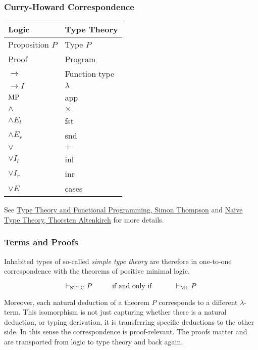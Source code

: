 \documentclass{beamer}
\theoremstyle{indentDefn} \newtheorem{defn}[]{Definition}
\begin{document}
\begin{frame}
  \frametitle{Curry-Howard Correspondence}

  \begin{center}
    \begin{tabular}{l|l}
      Logic & Type Theory \\
      \hline
      Proposition $P$ & Type $P$ \\
      Proof & Program \\
      $\to$ & Function type \\
      $\to I$ & $\lambda$ \\
      $\text{MP}$ & app \\
      $\land$ & $\times$ \\
      $\land E_{l}$ & fst \\
      $\land E_{r}$ & snd \\
      $\lor$ & $+$\\ 
      $\lor I_{l}$ & inl \\
      $\lor I_{r}$ & inr \\
      $\lor E$ & cases  
    \end{tabular}
  \end{center}
  
  See \href{https://www.cs.kent.ac.uk/people/staff/sjt/TTFP/}{Type Theory and Functional Programming, Simon Thompson} and \href{https://people.cs.nott.ac.uk/psztxa/publ/fomus19.pdf}{Naive Type Theory, Thorsten Altenkirch} for more details.
\end{frame}

\begin{frame}
  \frametitle{Terms and Proofs}

  Inhabited types of so-called \emph{simple type theory} are therefore in one-to-one correspondence with the theorems of positive minimal logic. 

  $$ \vdash_{\text{STLC}} P \hspace{1cm} \text{if and only if } \hspace{10mm} \vdash_{\text{ML}} P$$
  
  Moreover, each natural deduction of a theorem $P$ corresponds to a different $\lambda$-term. This isomorphism is not just capturing whether there is a natural deduction, or typing derivation, it is transferring specific deductions to the other side. In this sense the correspondence is proof-relevant. The proofs matter and are transported from logic to type theory and back again.

\end{frame}
\end{document}
